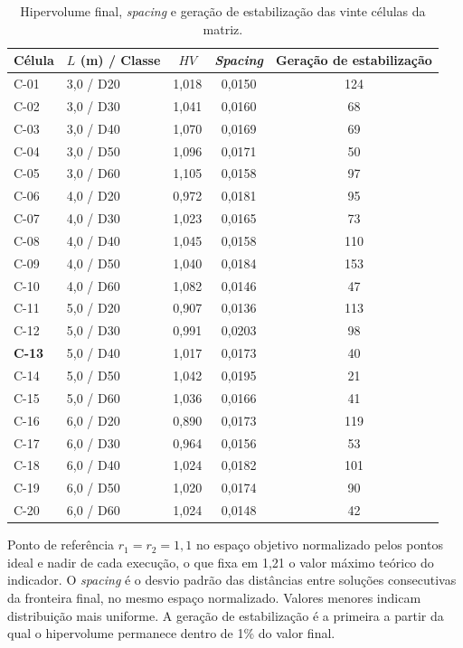 \begin{appendices}
\begin{table}[!ht]
\caption{Hipervolume final, \textit{spacing} e geração de estabilização das vinte células da matriz.\label{tab:hv}}
\begin{threeparttable}
\begin{tabular*}{\columnwidth}{@{\extracolsep\fill}llccc@{\extracolsep\fill}}
\toprule
Célula & $L$ (m) / Classe & $HV$ & \textit{Spacing} & Geração de estabilização \\
\midrule
C-01 & 3{,}0 / D20 & 1{,}018 & 0{,}0150 & 124 \\
C-02 & 3{,}0 / D30 & 1{,}041 & 0{,}0160 & 68 \\
C-03 & 3{,}0 / D40 & 1{,}070 & 0{,}0169 & 69 \\
C-04 & 3{,}0 / D50 & 1{,}096 & 0{,}0171 & 50 \\
C-05 & 3{,}0 / D60 & 1{,}105 & 0{,}0158 & 97 \\
\midrule
C-06 & 4{,}0 / D20 & 0{,}972 & 0{,}0181 & 95 \\
C-07 & 4{,}0 / D30 & 1{,}023 & 0{,}0165 & 73 \\
C-08 & 4{,}0 / D40 & 1{,}045 & 0{,}0158 & 110 \\
C-09 & 4{,}0 / D50 & 1{,}040 & 0{,}0184 & 153 \\
C-10 & 4{,}0 / D60 & 1{,}082 & 0{,}0146 & 47 \\
\midrule
C-11 & 5{,}0 / D20 & 0{,}907 & 0{,}0136 & 113 \\
C-12 & 5{,}0 / D30 & 0{,}991 & 0{,}0203 & 98 \\
\textbf{C-13} & 5{,}0 / D40 & 1{,}017 & 0{,}0173 & 40 \\
C-14 & 5{,}0 / D50 & 1{,}042 & 0{,}0195 & 21 \\
C-15 & 5{,}0 / D60 & 1{,}036 & 0{,}0166 & 41 \\
\midrule
C-16 & 6{,}0 / D20 & 0{,}890 & 0{,}0173 & 119 \\
C-17 & 6{,}0 / D30 & 0{,}964 & 0{,}0156 & 53 \\
C-18 & 6{,}0 / D40 & 1{,}024 & 0{,}0182 & 101 \\
C-19 & 6{,}0 / D50 & 1{,}020 & 0{,}0174 & 90 \\
C-20 & 6{,}0 / D60 & 1{,}024 & 0{,}0148 & 42 \\
\bottomrule
\end{tabular*}
\begin{tablenotes}
\footnotesize
\item Ponto de referência $r_1 = r_2 = 1{,}1$ no espaço objetivo normalizado pelos pontos ideal e nadir de cada execução, o que fixa em 1{,}21 o valor máximo teórico do indicador.
O \textit{spacing} é o desvio padrão das distâncias entre soluções consecutivas da fronteira final, no mesmo espaço normalizado. Valores menores indicam distribuição mais uniforme.
A geração de estabilização é a primeira a partir da qual o hipervolume permanece dentro de 1\% do valor final.
\end{tablenotes}
\end{threeparttable}
\end{table}

\end{appendices}
